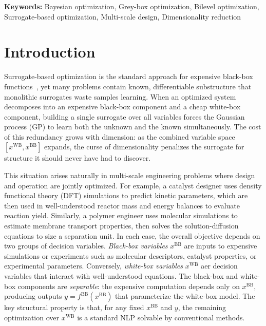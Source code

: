 \documentclass[12pt,a4paper]{article}%
\theoremstyle{plain}%
\theoremstyle{remark}%
\theoremstyle{definition}%
\def\WB{\mathrm{WB}}
\def\BB{\mathrm{BB}}
\begin{document}
\noindent\textbf{Keywords:} Bayesian optimization, Grey-box optimization, Bilevel optimization, Surrogate-based optimization, Multi-scale design, Dimensionality reduction

\section{Introduction}\label{sec:introduction}

Surrogate-based optimization is the standard approach for expensive black-box functions~\cite{frazier2018tutorial}, yet many problems contain known, differentiable substructure that monolithic surrogates waste samples learning. When an optimized system decomposes into an expensive black-box component and a cheap white-box component, building a single surrogate over all variables forces the Gaussian process (GP) to learn both the unknown and the known simultaneously. The cost of this redundancy grows with dimension: as the combined variable space $[x^{\WB}, x^{\BB}]$ expands, the curse of dimensionality penalizes the surrogate for structure it should never have had to discover.

This situation arises naturally in multi-scale engineering problems where design and operation are jointly optimized. For example, a catalyst designer uses density functional theory (DFT) simulations to predict kinetic parameters, which are then used in well-understood reactor mass and energy balances to evaluate reaction yield. Similarly, a polymer engineer uses molecular simulations to estimate membrane transport properties, then solves the solution-diffusion equations to size a separation unit. In each case, the overall objective depends on two groups of decision variables. \emph{Black-box variables} $x^{\BB}$ are inputs to expensive simulations or experiments such as molecular descriptors, catalyst properties, or experimental parameters. Conversely, \emph{white-box variables} $x^{\WB}$ aer decision variables that interact with well-understood equations. The black-box and white-box components are \emph{separable}: the expensive computation depends only on $x^{\BB}$, producing outputs $y = f^{\BB}(x^{\BB})$ that parameterize the white-box model. The key structural property is that, for any fixed $x^{\BB}$ and $y$, the remaining optimization over $x^{\WB}$ is a standard NLP solvable by conventional methods.
\end{document}
